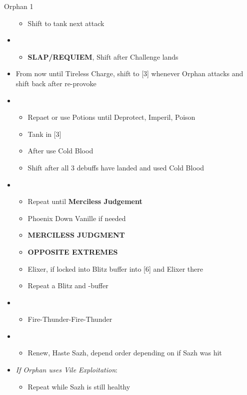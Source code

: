 \begin{battle}{Orphan 1}
\begin{multicols}{2}
\begin{itemize}
\begin{itemize}
        \item Shift to tank next attack
    \end{itemize}
    \item \third
    \begin{itemize}
        \item \textbf{SLAP/REQUIEM}, Shift after Challenge lands
    \end{itemize}
    \vfill\null
    \columnbreak
    \item From now until Tireless Charge, shift to [3] whenever Orphan attacks and shift back after re-provoke
    \item \fifth
    \begin{itemize}
        \item Repaet or use Potions until Deprotect, Imperil, Poison
        \item Tank in [3]
        \item After \stagger use Cold Blood
        \item Shift after all 3 debuffs have landed and used Cold Blood
    \end{itemize}
    \item \first
    \begin{itemize}
        \item Repeat until \textbf{Merciless Judgement}
        \item Phoenix Down Vanille if needed
        \item \textbf{MERCILESS JUDGMENT}
        \item \textbf{OPPOSITE EXTREMES}
        \item Elixer, if locked into Blitz buffer into [6] and Elixer there
        \item Repeat a Blitz and \rav-buffer
    \end{itemize}
    \item \sixth
    \begin{itemize}
        \item Fire-Thunder-Fire-Thunder
    \end{itemize}
    \item \fourth
    \begin{itemize}
        \item Renew, Haste Sazh, depend order depending on if Sazh was hit
    \end{itemize}
    \item \textit{If Orphan uses Vile Exploitation}:
    \begin{itemize}
        \item Repeat while Sazh is still healthy

\end{itemize}
\end{itemize}
\end{multicols}
\end{battle}

